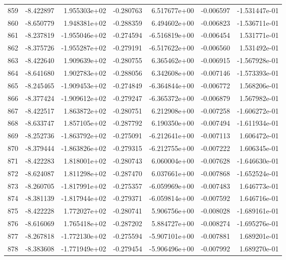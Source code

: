 \begin{tabular}{rrrrrrr}
 859 &  -8.422897 &  1.955303e+02 & -0.280763 &  6.517677e+00 &   -0.006597 & -1.531447e-01 \\
 860 &  -8.650779 &  1.948381e+02 & -0.288359 &  6.494602e+00 &   -0.006823 & -1.536711e-01 \\
 861 &  -8.237819 & -1.955046e+02 & -0.274594 & -6.516819e+00 &   -0.006454 &  1.531771e-01 \\
 862 &  -8.375726 & -1.955287e+02 & -0.279191 & -6.517622e+00 &   -0.006560 &  1.531492e-01 \\
 863 &  -8.422640 &  1.909639e+02 & -0.280755 &  6.365462e+00 &   -0.006915 & -1.567928e-01 \\
 864 &  -8.641680 &  1.902783e+02 & -0.288056 &  6.342608e+00 &   -0.007146 & -1.573393e-01 \\
 865 &  -8.245465 & -1.909453e+02 & -0.274849 & -6.364844e+00 &   -0.006772 &  1.568206e-01 \\
 866 &  -8.377424 & -1.909612e+02 & -0.279247 & -6.365372e+00 &   -0.006879 &  1.567982e-01 \\
 867 &  -8.422517 &  1.863872e+02 & -0.280751 &  6.212908e+00 &   -0.007258 & -1.606272e-01 \\
 868 &  -8.633747 &  1.857105e+02 & -0.287792 &  6.190350e+00 &   -0.007494 & -1.611934e-01 \\
 869 &  -8.252736 & -1.863792e+02 & -0.275091 & -6.212641e+00 &   -0.007113 &  1.606472e-01 \\
 870 &  -8.379444 & -1.863826e+02 & -0.279315 & -6.212755e+00 &   -0.007222 &  1.606345e-01 \\
 871 &  -8.422283 &  1.818001e+02 & -0.280743 &  6.060004e+00 &   -0.007628 & -1.646630e-01 \\
 872 &  -8.624087 &  1.811298e+02 & -0.287470 &  6.037661e+00 &   -0.007868 & -1.652524e-01 \\
 873 &  -8.260705 & -1.817991e+02 & -0.275357 & -6.059969e+00 &   -0.007483 &  1.646773e-01 \\
 874 &  -8.381139 & -1.817944e+02 & -0.279371 & -6.059814e+00 &   -0.007592 &  1.646716e-01 \\
 875 &  -8.422228 &  1.772027e+02 & -0.280741 &  5.906756e+00 &   -0.008028 & -1.689161e-01 \\
 876 &  -8.616069 &  1.765418e+02 & -0.287202 &  5.884727e+00 &   -0.008274 & -1.695276e-01 \\
 877 &  -8.267818 & -1.772130e+02 & -0.275594 & -5.907101e+00 &   -0.007881 &  1.689201e-01 \\
 878 &  -8.383608 & -1.771949e+02 & -0.279454 & -5.906496e+00 &   -0.007992 &  1.689270e-01 \\

\end{tabular}

